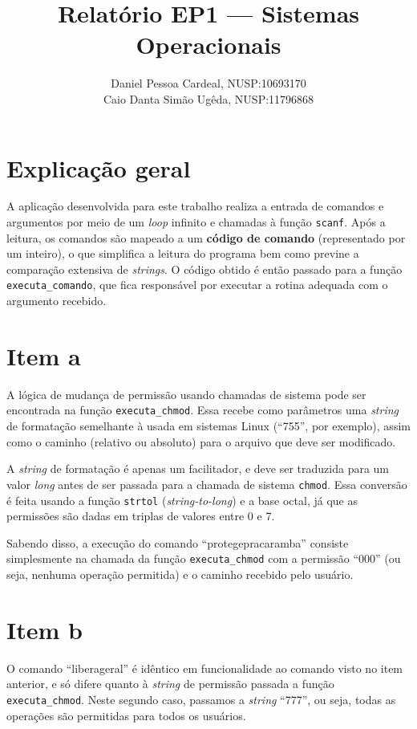 \documentclass[12pt, twoside, a4paper]{article}
\title{
	Relatório EP1 --- Sistemas Operacionais
}
\author{
	Daniel Pessoa Cardeal, N\degree{}USP:10693170 \\
	Caio Danta Simão Ugêda, N\degree{}USP:11796868
}
\date{}
\begin{document}
\maketitle

\section{Explicação geral}%

A aplicação desenvolvida para este trabalho realiza a entrada de comandos e argumentos por meio de um \textit{loop} infinito e chamadas à função \verb|scanf|. Após a leitura, os comandos são mapeado a um \textbf{código de comando} (representado por um inteiro), o que simplifica a leitura do programa bem como previne a comparação extensiva de \emph{strings}. O código obtido é então passado para a função \verb|executa_comando|, que fica responsável por executar a rotina adequada com o argumento recebido.

\section{Item a}%

A lógica de mudança de permissão usando chamadas de sistema pode ser encontrada na função \verb|executa_chmod|. Essa recebe como parâmetros uma \emph{string} de formatação semelhante à usada em sistemas Linux (``755'', por exemplo), assim como o caminho (relativo ou absoluto) para o arquivo que deve ser modificado.

A \emph{string} de formatação é apenas um facilitador, e deve ser traduzida para um valor \textit{long} antes de ser passada para a chamada de sistema \verb|chmod|. Essa conversão é feita usando a função \verb|strtol| (\textit{string-to-long}) e a base octal, já que as permissões são dadas em triplas de valores entre 0 e 7.

Sabendo disso, a execução do comando ``protegepracaramba'' consiste simplesmente na chamada da função \verb|executa_chmod| com a permissão ``000'' (ou seja, nenhuma operação permitida) e o caminho recebido pelo usuário.

\section{Item b}%

O comando ``liberageral'' é idêntico em funcionalidade ao comando visto no item anterior, e só difere quanto à \textit{string} de permissão passada a função \verb|executa_chmod|. Neste segundo caso, passamos a \emph{string} ``777'', ou seja, todas as operações são permitidas para todos os usuários.
\end{document}
